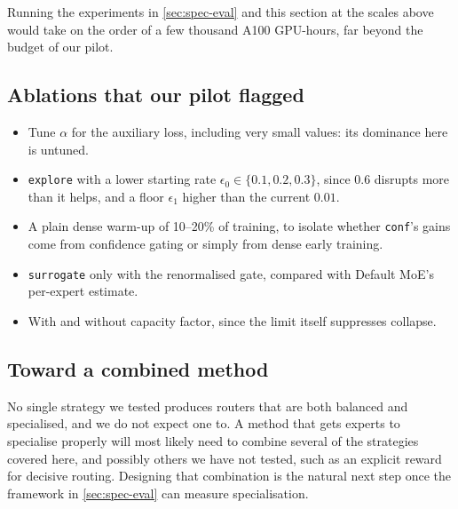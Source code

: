 \documentclass[10pt]{article}
\theoremstyle{definition}
\theoremstyle{remark}
\newcommand{\code}[1]{\texttt{#1}}
\begin{document}
Running the experiments in \cref{sec:spec-eval} and this section at the scales above would take on the order of a few thousand A100 GPU-hours, far beyond the budget of our pilot.

\subsection{Ablations that our pilot flagged}
\begin{itemize}
  \item Tune $\alpha$ for the auxiliary loss, including very small values: its dominance here is untuned.
  \item \code{explore} with a lower starting rate $\epsilon_0\in\{0.1,0.2,0.3\}$, since $0.6$ disrupts more than it helps, and a floor $\epsilon_1$ higher than the current $0.01$.
  \item A plain dense warm-up of 10--20\% of training, to isolate whether \code{conf}'s gains come from confidence gating or simply from dense early training.
  \item \code{surrogate} only with the renormalised gate, compared with Default MoE's per-expert estimate.
  \item With and without capacity factor, since the limit itself suppresses collapse.
\end{itemize}

\subsection{Toward a combined method}
\label{sec:combined}
No single strategy we tested produces routers that are both balanced and specialised, and we do not expect one to. A method that gets experts to specialise properly will most likely need to combine several of the strategies covered here, and possibly others we have not tested, such as an explicit reward for decisive routing. Designing that combination is the natural next step once the framework in \cref{sec:spec-eval} can measure specialisation.
\end{document}
